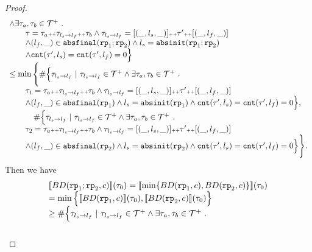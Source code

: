 \begin{proof}
\[\begin{array}{l}
      \land \exists \mathtt{\tau}_a, \mathtt{\tau}_b \in \mathcal{T}^{+}
      ~.~ 
      \\ \qquad
      \mathtt{\tau} = \mathtt{\tau}_a {\scriptscriptstyle ++} \mathtt{\tau}_{l_s \to l_f} {\scriptscriptstyle ++} \mathtt{\tau}_b
      \land \mathtt{\tau}_{l_s \to l_f} = [(\_, l_s, \_)] {\scriptscriptstyle ++} \mathtt{\tau}' {\scriptscriptstyle ++} [(\_, l_f, \_)]
      \\ \qquad
      \land (l_{f}, \_) \in \mathtt{abs}{\mathtt{final}}(\mathtt{rp}_1; \mathtt{rp}_2)
      \land l_s = \mathtt{abs}{\mathtt{init}}(\mathtt{rp}_1; \mathtt{rp}_2)
      \\ \qquad 
      \land \mathtt{cnt}(\mathtt{\tau}', l_s) = \mathtt{cnt}(\mathtt{\tau}', l_f) = 0 
      \Big\}
      \\ \leq 
      \min \Bigg\{ \#
      \Big\{\mathtt{\tau}_{l_s \to l_f} 
      ~\vert~ \mathtt{\tau}_{l_s \to l_f} \in \mathcal{T}^{+} 
      \land \exists \mathtt{\tau}_a, \mathtt{\tau}_b \in \mathcal{T}^{+}
      ~.~ 
      \\ \qquad
      \mathtt{\tau}_1 = \mathtt{\tau}_a {\scriptscriptstyle ++} \mathtt{\tau}_{l_s \to l_f} {\scriptscriptstyle ++} \mathtt{\tau}_b
      \land \mathtt{\tau}_{l_s \to l_f} = [(\_, l_s, \_)] {\scriptscriptstyle ++} \mathtt{\tau}' {\scriptscriptstyle ++} [(\_, l_f, \_)]
        \\ \qquad
      \land (l_{f}, \_) \in \mathtt{abs}{\mathtt{final}}(\mathtt{rp}_1)
      \land l_s = \mathtt{abs}{\mathtt{init}}(\mathtt{rp}_1)
      \land \mathtt{cnt}(\mathtt{\tau}', l_s) = \mathtt{cnt}(\mathtt{\tau}', l_f) = 0 
      \Big\},
      \\ \qquad \quad
      \#
      \Big\{\mathtt{\tau}_{l_s \to l_f} 
      ~\vert~ \mathtt{\tau}_{l_s \to l_f} \in \mathcal{T}^{+} 
      \land \exists \mathtt{\tau}_a, \mathtt{\tau}_b \in \mathcal{T}^{+}
      ~.~ 
      \\ \qquad
      \mathtt{\tau}_2 = \mathtt{\tau}_a {\scriptscriptstyle ++} \mathtt{\tau}_{l_s \to l_f} {\scriptscriptstyle ++} \mathtt{\tau}_b
      \land \mathtt{\tau}_{l_s \to l_f} = [(\_, l_s, \_)] {\scriptscriptstyle ++} \mathtt{\tau}' {\scriptscriptstyle ++} [(\_, l_f, \_)]
       \\ \qquad
     \land (l_{f}, \_) \in \mathtt{abs}{\mathtt{final}}(\mathtt{rp}_2)
     \land l_s = \mathtt{abs}{\mathtt{init}}(\mathtt{rp}_2)
     \land \mathtt{cnt}(\mathtt{\tau}', l_s) = \mathtt{cnt}(\mathtt{\tau}', l_f) = 0 
     \Big\} 
     \Bigg\}.
      \end{array}
    \]
    Then we have
    \[
      \begin{array}{l}
      \llbracket BD(\mathtt{rp}_1; \mathtt{rp}_2, c) \rrbracket(\mathtt{\tau}_0) =
      \llbracket \min \{ BD(\mathtt{rp}_1, c), BD(\mathtt{rp}_2, c) \} \rrbracket(\mathtt{\tau}_0)
      \\
      = \min \Big\{ \llbracket BD(\mathtt{rp}_1, c) \rrbracket(\mathtt{\tau}_0), \llbracket BD(\mathtt{rp}_2, c) \rrbracket(\mathtt{\tau}_0) \Big\}
      \\
      \geq
      \# \Big\{\mathtt{\tau}_{l_s \to l_f} 
      ~\vert~ \mathtt{\tau}_{l_s \to l_f} \in \mathcal{T}^{+} 
      \land \exists \mathtt{\tau}_a, \mathtt{\tau}_b \in \mathcal{T}^{+}
      ~.~ 
      \\ \qquad

\end{array}\]
\end{proof}

